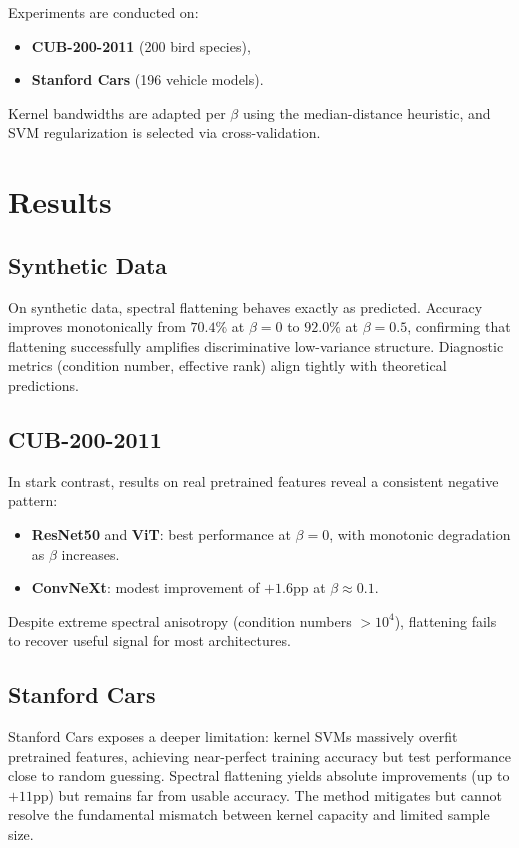 \documentclass{article}
\begin{document}
Experiments are conducted on:
\begin{itemize}
    \item \textbf{CUB-200-2011} (200 bird species),
    \item \textbf{Stanford Cars} (196 vehicle models).
\end{itemize}

Kernel bandwidths are adapted per $\beta$ using the median-distance heuristic, and SVM regularization is selected via cross-validation.

\section{Results}

\subsection{Synthetic Data}

On synthetic data, spectral flattening behaves exactly as predicted. Accuracy improves monotonically from $70.4\%$ at $\beta=0$ to $92.0\%$ at $\beta=0.5$, confirming that flattening successfully amplifies discriminative low-variance structure. Diagnostic metrics (condition number, effective rank) align tightly with theoretical predictions.

\subsection{CUB-200-2011}

In stark contrast, results on real pretrained features reveal a consistent negative pattern:
\begin{itemize}
    \item \textbf{ResNet50} and \textbf{ViT}: best performance at $\beta=0$, with monotonic degradation as $\beta$ increases.
    \item \textbf{ConvNeXt}: modest improvement of $+1.6$pp at $\beta \approx 0.1$.
\end{itemize}

Despite extreme spectral anisotropy (condition numbers $>10^4$), flattening fails to recover useful signal for most architectures.

\subsection{Stanford Cars}

Stanford Cars exposes a deeper limitation: kernel SVMs massively overfit pretrained features, achieving near-perfect training accuracy but test performance close to random guessing. Spectral flattening yields absolute improvements (up to $+11$pp) but remains far from usable accuracy. The method mitigates but cannot resolve the fundamental mismatch between kernel capacity and limited sample size.
\end{document}
